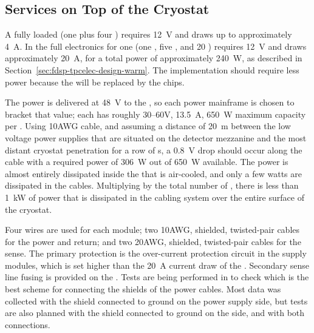 

\subsection{Services on Top of the Cryostat}
\label{sec:fdsp-tpcelec-design-services}

A fully loaded  (one  plus four ) 
requires \SI{12}{V} and draws up to approximately \SI{4}{A}.  In 
 the full electronics for one  (one , 
five , and \num{20} ) requires \SI{12}{V} and 
draws approximately \SI{20}{A}, for a total power of approximately 
\SI{240}{W}, as described in Section~\ref{sec:fdsp-tpcelec-design-warm}. 
The  implementation should require less power because 
the  will be replaced by the  chips.

The  power is delivered at \SI{48}{V} to the , 
so each  power mainframe is chosen to bracket that value; 
each has roughly \numrange{30}{60}{V}, \SI{13.5}{A}, \SI{650}{W} 
maximum capacity per . Using 10AWG cable, and assuming
a distance of \SI{20}{m} between the low voltage power supplies 
that are situated on the detector mezzanine and the most distant
cryostat penetration for a row of s, a \SI{0.8}{V} 
drop should occur along the cable with a required power of 
\SI{306}{W} out of \SI{650}{W} available. The power is almost entirely
dissipated inside the  that is air-cooled, and
only a few watts are dissipated in the cables. Multiplying by
the total number of , there is less than \SI{1}{kW} of
power that is dissipated in the cabling system over the entire
surface of the cryostat.

Four wires are used for each module; two 10AWG, shielded, twisted-pair 
cables for the power and return; and two 20AWG, shielded, twisted-pair 
cables for the sense. The primary protection is the over-current 
protection circuit in the  supply modules, which is set 
higher than the \SI{20}{A} current draw of the . 
Secondary sense line fusing is provided on the .  
Tests are being performed in  to check which is the
best scheme for connecting the shields of the power cables. Most 
data was collected with the shield connected to ground on the 
power supply side, but tests are also planned with the shield
connected to ground on the  side, and with both
connections.

